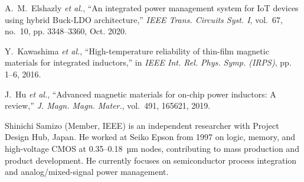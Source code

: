 \documentclass[conference]{IEEEtran}
\begin{document}
\begin{thebibliography}{10}
A.~M.~Elshazly \emph{et al.}, ``An integrated power management system for IoT devices using hybrid Buck-LDO architecture,'' \emph{IEEE Trans. Circuits Syst. I}, vol.~67, no.~10, pp. 3348--3360, Oct. 2020.

Y.~Kawashima \emph{et al.}, ``High-temperature reliability of thin-film magnetic materials for integrated inductors,'' in \emph{IEEE Int. Rel. Phys. Symp. (IRPS)}, pp. 1--6, 2016.

J.~Hu \emph{et al.}, ``Advanced magnetic materials for on-chip power inductors: A review,'' \emph{J. Magn. Magn. Mater.}, vol.~491, 165621, 2019.

\end{thebibliography}

\begin{IEEEbiography}{Shinichi Samizo}
(Member, IEEE) is an independent researcher with Project Design Hub, Japan. He worked at Seiko Epson from 1997 on logic, memory, and high-voltage CMOS at 0.35--0.18~µm nodes, contributing to mass production and product development. He currently focuses on semiconductor process integration and analog/mixed-signal power management.
\end{IEEEbiography}
\end{document}
